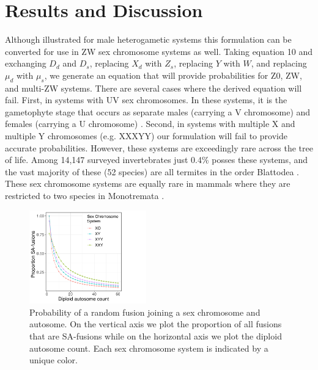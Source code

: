 \documentclass[12pt]{article}
\begin{document}
\section{Results and Discussion}

Although illustrated for male heterogametic systems this formulation can be converted for use in ZW sex chromosome systems as well.
Taking equation 10 and exchanging $D_d$ and $D_s$, replacing $X_d$ with $Z_s$, replacing $Y$ with $W$, and replacing $\mu_d$ with $\mu_s$, we generate an equation that will provide probabilities for Z0, ZW, and multi-ZW systems.
There are several cases where the derived equation will fail.
First, in systems with UV sex chromosomes. 
In these systems, it is the gametophyte stage that occurs as separate males (carrying a V chromosome) and females (carrying a U chromosome) \citep{bachtrog2014sex}.
Second, in systems with multiple X and multiple Y chromosomes (e.g. XXXYY) our formulation will fail to provide accurate probabilities.
However, these systems are exceedingly rare across the tree of life.
Among 14,147 surveyed invertebrates just 0.4\% posses these systems, and the vast majority of these (52 species) are all termites in the order Blattodea \citep{blackmon2017}. 
These sex chromosome systems are equally rare in mammals where they are restricted to two species in Monotremata \citep{ashman2014tree}.

\begin{figure} %
    \centering
    \includegraphics[width=0.45\textwidth]{autosome.num.pdf}
\caption{Probability of a random fusion joining a sex chromosome and autosome. On the vertical axis we plot the proportion of all fusions that are SA-fusions while on the horizontal axis we plot the diploid autosome count. Each sex chromosome system is indicated by a unique color.}
\end{figure}
\end{document}
